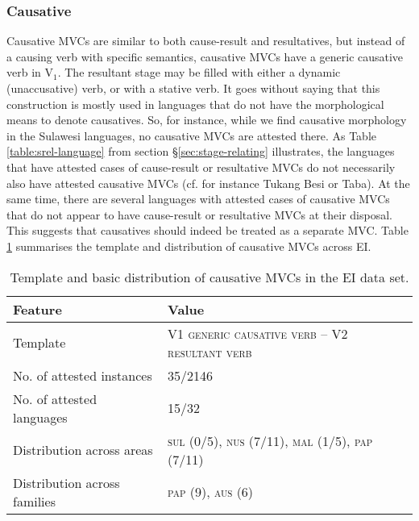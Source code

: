 \subsubsection{Causative}

Causative MVCs are similar to both cause-result and resultatives, but instead of a causing verb with specific semantics, causative MVCs have a generic causative verb in V$_1$. The resultant stage may be filled with either a dynamic (unaccusative) verb, or with a stative verb. It goes without saying that this construction is mostly used in languages that do not have the morphological means to denote causatives. So, for instance, while we find causative morphology in the Sulawesi languages, no causative MVCs are attested there. As Table \ref{table:srel-language} from section §\ref{sec:stage-relating} illustrates, the languages that have attested cases of cause-result or resultative MVCs do not necessarily also have attested causative MVCs (cf. for instance Tukang Besi or Taba). At the same time, there are several languages with attested cases of causative MVCs that do not appear to have cause-result or resultative MVCs at their disposal. This suggests that causatives should indeed be treated as a separate MVC. Table \ref{table:causative} summarises the template and distribution of causative MVCs across EI.

\begin{table}


\begin{tabular}{ll}
\lsptoprule
Feature&Value\tabularnewline
\hline
Template&V1 \textsc{generic causative verb} -- V2 \textsc{resultant verb}\tabularnewline
No. of attested instances& 35/2146 \tabularnewline
No. of attested languages& 15/32 \tabularnewline
Distribution across areas& \textsc{sul} (0/5), \textsc{nus} (7/11), \textsc{mal} (1/5), \textsc{pap} (7/11) \tabularnewline
Distribution across families& \textsc{pap} (9), \textsc{aus} (6) \tabularnewline
\hline
\end{tabular}
\caption[Template and basic distribution of causative MVCs]{Template and basic distribution of causative MVCs in the EI data set.}
\label{table:causative}
\end{table}


